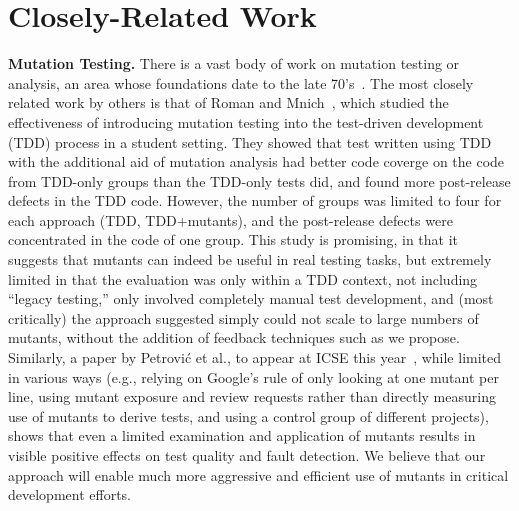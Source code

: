 \section{Closely-Related Work}

\noindent\textbf{Mutation Testing.}
%
There is a vast body of work on mutation testing or analysis, an area whose foundations date
to the late 70's~\cite{demillo1978hints,budd1980theoretical}.  
The most closely related work by others is that of Roman and
Mnich~\cite{tddmut}, which studied the effectiveness of introducing
mutation testing into the test-driven development (TDD) process in a
student setting.  They showed that test written using TDD with the
additional aid of mutation analysis had better code coverge on the
code from TDD-only groups than the TDD-only tests did, and found more
post-release defects in the TDD code.  However, the number of groups
was limited to four for each approach (TDD, TDD+mutants), and the
post-release defects were concentrated in the code of one group.  This
study is promising, in that it suggests that mutants can indeed be
useful in real testing tasks, but extremely limited in that the
evaluation was only within a TDD context, not including ``legacy
testing,'' only involved completely manual test development, and (most
critically) the approach suggested simply could not scale to large
numbers of mutants, without the addition of feedback techniques such
as we propose.   Similarly, a paper by Petrovi\'c et al., to appear at ICSE this
year~\cite{MutImpTest}, while limited in various ways (e.g., relying on Google's rule of only looking at one
mutant per line, using mutant exposure and review requests rather than
directly measuring use of mutants to derive tests, and using a control group of different projects), shows that even a limited examination and
application of mutants results in
visible positive effects on test quality and fault detection.  We
believe that our approach will enable much more aggressive and efficient use of
mutants in critical development efforts.

